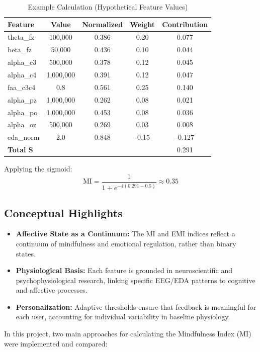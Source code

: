 \begin{table}[h!]
\centering
\caption{Example Calculation (Hypothetical Feature Values)}
\begin{tabular}{|l|c|c|c|c|}
\hline
\textbf{Feature} & \textbf{Value} & \textbf{Normalized} & \textbf{Weight} & \textbf{Contribution} \\
\hline
theta\_fz & 100,000 & 0.386 & 0.20 & 0.077 \\
beta\_fz & 50,000 & 0.436 & 0.10 & 0.044 \\
alpha\_c3 & 500,000 & 0.378 & 0.12 & 0.045 \\
alpha\_c4 & 1,000,000 & 0.391 & 0.12 & 0.047 \\
faa\_c3c4 & 0.8 & 0.561 & 0.25 & 0.140 \\
alpha\_pz & 1,000,000 & 0.262 & 0.08 & 0.021 \\
alpha\_po & 1,000,000 & 0.453 & 0.08 & 0.036 \\
alpha\_oz & 500,000 & 0.269 & 0.03 & 0.008 \\
eda\_norm & 2.0 & 0.848 & -0.15 & -0.127 \\
\hline
\textbf{Total S} & & & & 0.291 \\
\hline
\end{tabular}
\end{table}

Applying the sigmoid:
\[
    \text{MI} = \frac{1}{1 + e^{-4(0.291 - 0.5)}} \approx 0.35
\]

\subsection*{Conceptual Highlights}
\begin{itemize}
    \item \textbf{Affective State as a Continuum:} The MI and EMI indices reflect a continuum of mindfulness and emotional regulation, rather than binary states.
    \item \textbf{Physiological Basis:} Each feature is grounded in neuroscientific and psychophysiological research, linking specific EEG/EDA patterns to cognitive and affective processes.
    \item \textbf{Personalization:} Adaptive thresholds ensure that feedback is meaningful for each user, accounting for individual variability in baseline physiology.
\end{itemize}


In this project, two main approaches for calculating the Mindfulness Index (MI) were implemented and compared:

